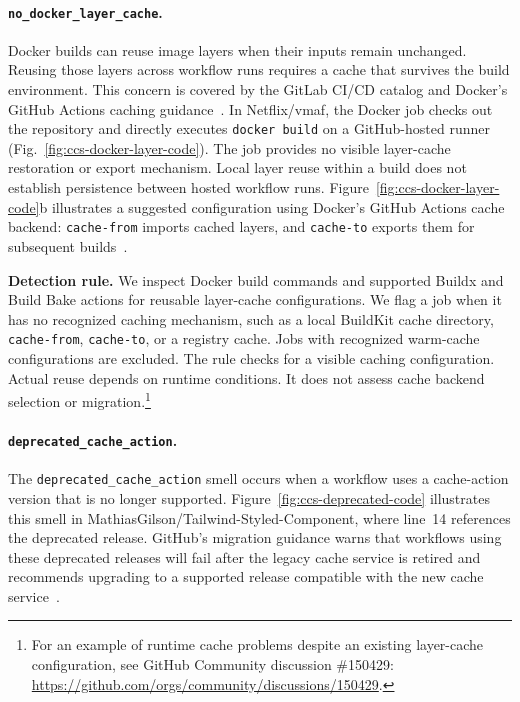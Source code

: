\documentclass[smallextended]{svjour3}
\begin{document}
\FloatBarrier
\paragraph{\texttt{no\_docker\_layer\_cache}.}
Docker builds can reuse image layers when their inputs remain unchanged. Reusing those layers across workflow runs requires a cache that survives the build environment. This concern is covered by the GitLab CI/CD catalog and Docker's GitHub Actions caching guidance~\citep{urdih2026cache,docker_gha_cache_docs}. In Netflix/vmaf, the Docker job checks out the repository and directly executes \texttt{docker build} on a GitHub-hosted runner (Fig.~\ref{fig:ccs-docker-layer-code}). The job provides no visible layer-cache restoration or export mechanism. Local layer reuse within a build does not establish persistence between hosted workflow runs. Figure~\ref{fig:ccs-docker-layer-code}b illustrates a suggested configuration using Docker's GitHub Actions cache backend: \texttt{cache-from} imports cached layers, and \texttt{cache-to} exports them for subsequent builds~\citep{docker_gha_cache_docs}.



\textbf{Detection rule.}
We inspect Docker build commands and supported Buildx and Build Bake actions for reusable layer-cache configurations. We flag a job when it has no recognized caching mechanism, such as a local BuildKit cache directory, \texttt{cache-from}, \texttt{cache-to}, or a registry cache. Jobs with recognized warm-cache configurations are excluded. The rule checks for a visible caching configuration. Actual reuse depends on runtime conditions. It does not assess cache backend selection or migration.\footnote{For an example of runtime cache problems despite an existing layer-cache configuration, see GitHub Community discussion \#150429: \url{https://github.com/orgs/community/discussions/150429}.}



\FloatBarrier
\paragraph{\texttt{deprecated\_cache\_action}.}
The \texttt{deprecated\_cache\_action} smell occurs when a workflow uses a cache-action version that is no longer supported. Figure~\ref{fig:ccs-deprecated-code} illustrates this smell in MathiasGilson/Tailwind-Styled-Component, where line~14 references the deprecated  release. GitHub's migration guidance warns that workflows using these deprecated releases will fail after the legacy cache service is retired and recommends upgrading to a supported release compatible with the new cache service~\citep{case_cache_migration_cutoff}.
\end{document}
